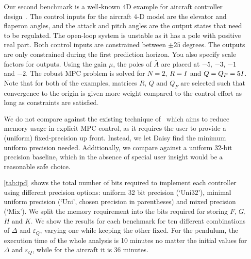 Our second benchmark is a well-known 4D example for aircraft
controller design~\cite{Kapasouris:1998}.
The control inputs for the aircraft 4-D model are the elevator and flaperon angles,
and the attack and pitch angles are the output states that need to be regulated.
The open-loop system is unstable as it has a pole with positive real part. Both
control inputs are constrained between $\pm25$ degrees. The outputs are
only constrained during the first prediction horizon. You also specify scale
factors for outputs. Using the gain $\mu$, the poles of $\bar A$ are placed at
$-5$, $-3$, $-1$ and $-2$. The robust MPC problem is solved for $N=2$,
$R=\mathbf{\it I}$ and $Q=Q_F=5\mathbf{\it I}$. Note that for both of the
examples, matrices $R$, $Q$ and $Q_F$ are selected such that convergence to the
origin is given more weight compared to the control effort as long as
constraints are satisfied.



We do not compare against the existing technique of~\citet{imperialrmpc} which aims to reduce memory
usage in explicit MPC control, as it requires the user to provide a (uniform)
fixed-precision up front. Instead, we let Daisy find the minimum uniform
precision needed. Additionally, we compare against a uniform 32-bit precision
baseline, which in the absence of special user insight would be a reasonable safe choice.

\autoref{tab:ipd} shows the total number of bits required to implement each
controller using different precision options: uniform 32 bit precision
(`Uni32'), minimal uniform precision (`Uni', chosen precision in parentheses)
and mixed precision (`Mix'). We split the memory requirement into the bits
required for storing $F$, $G$, $H$ and $K$. We show the results for each benchmark
for ten different combinations of $\Delta$ and $\varepsilon_Q$, varying one while
keeping the other fixed.
For the pendulum, the execution time of the whole analysis is 10 minutes no matter the
initial values for $\Delta$ and $\varepsilon_Q$, while for the aircraft it is 36
minutes. 



